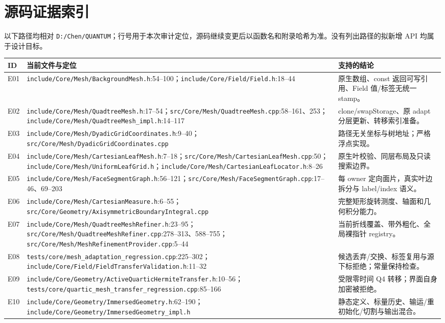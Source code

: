 \documentclass[UTF8,a4paper,11pt,fontset=fandol]{ctexart}
\newcommand{\code}[1]{\nolinkurl{#1}}
\begin{document}
\section{源码证据索引}
以下路径均相对 \code{D:/Chen/QUANTUM}；行号用于本次审计定位，源码继续变更后以函数名和附录哈希为准。没有列出路径的拟新增 API 均属于设计目标。
\small
\begin{longtable}{@{}P{.07\textwidth}P{.58\textwidth}P{.29\textwidth}@{}}
\toprule ID & 当前文件与定位 & 支持的结论\\\midrule\endhead
E01 & \code{include/Core/Mesh/BackgroundMesh.h}:54--100；\code{include/Core/Field/Field.h}:18--44 & 原生数组、const 返回可写引用、Field 值/标签无统一 stamp。\\
E02 & \code{include/Core/Mesh/QuadtreeMesh.h}:17--54；\code{src/Core/Mesh/QuadtreeMesh.cpp}:58--161、253；\code{include/Core/Mesh/QuadtreeMesh_impl.h}:14--117 & clone/swapStorage、原 adapt 分层更新、转移索引准备。\\
E03 & \code{include/Core/Mesh/DyadicGridCoordinates.h}:9--40；\code{src/Core/Mesh/DyadicGridCoordinates.cpp} & 路径无关坐标与树地址；严格浮点实现。\\
E04 & \code{include/Core/Mesh/CartesianLeafMesh.h}:7--18；\code{src/Core/Mesh/CartesianLeafMesh.cpp}:50；\code{include/Core/Mesh/UniformLeafGrid.h}；\code{include/Core/Mesh/CartesianLeafLocator.h}:8--26 & 原生叶校验、同层布局及只读搜索边界。\\
E05 & \code{include/Core/Mesh/FaceSegmentGraph.h}:56--121；\code{src/Core/Mesh/FaceSegmentGraph.cpp}:17--46、69--203 & 每 owner 定向面片，真实叶边拆分与 label/index 语义。\\
E06 & \code{include/Core/Mesh/CartesianMeasure.h}:6--55；\code{src/Core/Geometry/AxisymmetricBoundaryIntegral.cpp} & 完整矩形旋转测度、轴面和几何积分能力。\\
E07 & \code{include/Core/Mesh/QuadtreeMeshRefiner.h}:23--95；\code{src/Core/Mesh/QuadtreeMeshRefiner.cpp}:278--313、588--755；\code{src/Core/Mesh/MeshRefinementProvider.cpp}:5--44 & 当前折线覆盖、带外粗化、全局裸指针 registry。\\
E08 & \code{tests/core/mesh_adaptation_regression.cpp}:225--302；\code{include/Core/Field/FieldTransferValidation.h}:11--32 & 候选丢弃/交换、标签复用与源下标拒绝；常量保持检查。\\
E09 & \code{include/Core/Geometry/ActiveQuarticHermiteTransfer.h}:10--56；\code{tests/core/quartic_mesh_transfer_regression.cpp}:85--166 & 受限零时间 Q4 转移；界面自身加密被拒绝。\\
E10 & \code{include/Core/Geometry/ImmersedGeometry.h}:62--190；\code{include/Core/Geometry/ImmersedGeometry_impl.h} & 静态定义、标量历史、输运/重初始化/切割与输出混合。\\

\end{longtable}
\end{document}
